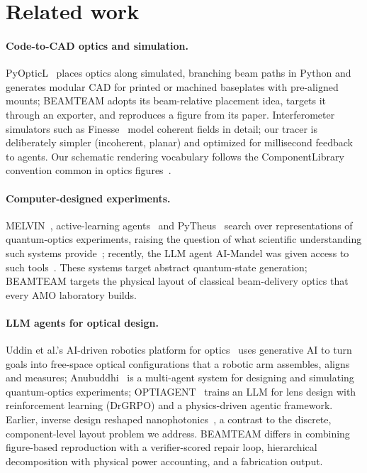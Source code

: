 \documentclass[10pt,twocolumn,letterpaper]{article}
\begin{document}
\section{Related work}
\label{sec:related}
\paragraph{Code-to-CAD optics and simulation.} PyOpticL~\cite{pyopticl} places optics along simulated, branching beam paths in Python and generates modular CAD for printed or machined baseplates with pre-aligned mounts; BEAMTEAM adopts its beam-relative placement idea, targets it through an exporter, and reproduces a figure from its paper. Interferometer simulators such as Finesse~\cite{finesse} model coherent fields in detail; our tracer is deliberately simpler (incoherent, planar) and optimized for millisecond feedback to agents. Our schematic rendering vocabulary follows the ComponentLibrary convention common in optics figures~\cite{franzen}.

\paragraph{Computer-designed experiments.} MELVIN~\cite{krenn2016melvin}, active-learning agents~\cite{melnikov2018} and PyTheus~\cite{pytheus2023} search over representations of quantum-optics experiments, raising the question of what scientific understanding such systems provide~\cite{krenn2022understanding}; recently, the LLM agent AI-Mandel was given access to such tools~\cite{llmpytheus2025}. These systems target abstract quantum-state generation; BEAMTEAM targets the physical layout of classical beam-delivery optics that every AMO laboratory builds.

\paragraph{LLM agents for optical design.} Uddin et al.'s AI-driven robotics platform for optics~\cite{optomate2025} uses generative AI to turn goals into free-space optical configurations that a robotic arm assembles, aligns and measures; Anubuddhi~\cite{anubuddhi2025} is a multi-agent system for designing and simulating quantum-optics experiments; OPTIAGENT~\cite{optiagent2026} trains an LLM for lens design with reinforcement learning (DrGRPO) and a physics-driven agentic framework. Earlier, inverse design reshaped nanophotonics~\cite{molesky2018}, a contrast to the discrete, component-level layout problem we address. BEAMTEAM differs in combining figure-based reproduction with a verifier-scored repair loop, hierarchical decomposition with physical power accounting, and a fabrication output.
\end{document}

